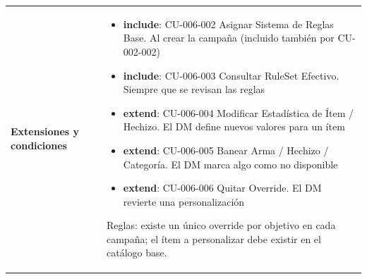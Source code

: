 {\begin{longtable}{|>{\raggedright\arraybackslash\bfseries}p{3.2cm}|>{\raggedright\arraybackslash}p{11.9cm}|}
Extensiones y condiciones & \begin{itemize}[itemsep=2pt,topsep=2pt]
\item \textbf{include}: CU-006-002 Asignar Sistema de Reglas Base. Al crear la campaña (incluido también por CU-002-002)
\item \textbf{include}: CU-006-003 Consultar RuleSet Efectivo. Siempre que se revisan las reglas
\item \textbf{extend}: CU-006-004 Modificar Estadística de Ítem / Hechizo. El DM define nuevos valores para un ítem
\item \textbf{extend}: CU-006-005 Banear Arma / Hechizo / Categoría. El DM marca algo como no disponible
\item \textbf{extend}: CU-006-006 Quitar Override. El DM revierte una personalización
\end{itemize}
Reglas: existe un único override por objetivo en cada campaña; el ítem a personalizar debe existir en el catálogo base.


\end{longtable}}
